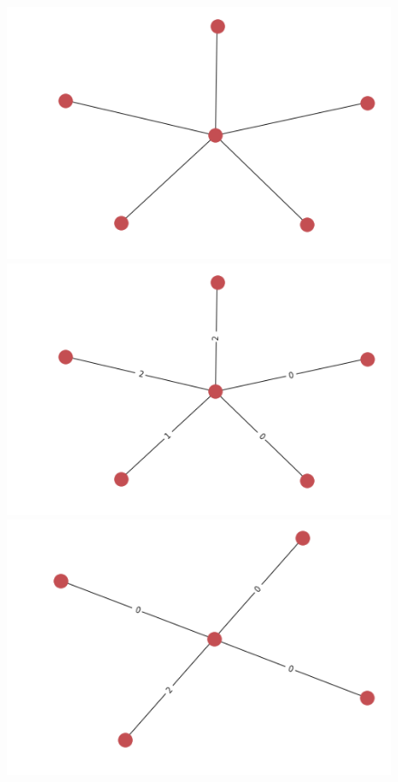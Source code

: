 \documentclass{article}
\theoremstyle{definition}
\begin{document}
\begin{figure}[!htb]
	\begin{multicols}{4}
		\includegraphics[width=\linewidth]{data/generated-graphs/star_base.png}\par
		\includegraphics[width=\linewidth]{data/generated-graphs/star_labels.png}\par
		\includegraphics[width=\linewidth]{data/generated-graphs/star_altered_struct.png}\par

\end{multicols}
\end{figure}
\end{document}
